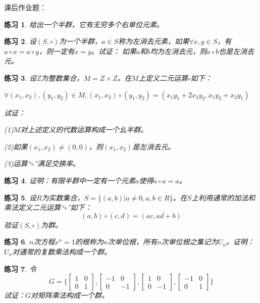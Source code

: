 \documentclass{article}
\newtheorem{Exercise}{练习}
\begin{document}
\begin{CJK*}{UTF8}{gbsn}
  课后作业题：

\begin{Exercise}
  给出一个半群，它有无穷多个右单位元素。
\end{Exercise}

\begin{Exercise}
  设$(S,\circ)$为一个半群，$a\in S$称为左消去元素，如果$\forall x, y\in S$，有$a\circ x=a\circ y$，则一定有$x=y$。试证：
  如果$a$和$b$均为左消去元，则$a\circ b$也是左消去元。
\end{Exercise}

\begin{Exercise}
  设$Z$为整数集合，$M=Z\times Z$。在$M$上定义二元运算$\circ$如下：

  $\forall (x_1,x_2), (y_1,y_2)\in M, (x_1,x_2)\circ (y_1,y_2)=(x_1y_1+2x_2y_2,x_1y_2+x_2y_1)$

  试证：

  (1)$M$对上述定义的代数运算构成一个幺半群。

  (2)如果$(x_1,x_2)\neq (0,0)$，则$(x_1,x_2)$是左消去元。

  (3)运算“$\circ$”满足交换率。
\end{Exercise}


\begin{Exercise}
  证明：有限半群中一定有一个元素$a$使得$a\circ a=a$。
\end{Exercise}


\begin{Exercise}
  设$R$为实数集合，$S=\{(a,b)|a\neq 0,a,b\in R\}$。在$S$上利用通常的加法和乘法定义二元运算“$\circ$”如下：
  \[(a,b)\circ (c,d) = (ac, ad + b)\]
  验证$(S,\circ)$为群。
\end{Exercise}

\begin{Exercise}
  $n$次方程$x^n=1$的根称为$n$次单位根，所有$n$次单位根之集记为$U_n$。证明：$U_n$对通常的复数乘法构成一个群。
\end{Exercise}


\begin{Exercise}
 令
 \[G=\bigg\{\begin{bmatrix}
  1&0\\0&1
 \end{bmatrix},
 \begin{bmatrix}
  -1&0\\0&-1
 \end{bmatrix},
 \begin{bmatrix}
  1&0\\0&-1
 \end{bmatrix},
 \begin{bmatrix}
  -1&0\\0&1
 \end{bmatrix}\bigg\}\] 
 试证：$G$对矩阵乘法构成一个群。
\end{Exercise}




\end{CJK*}
\end{document}
